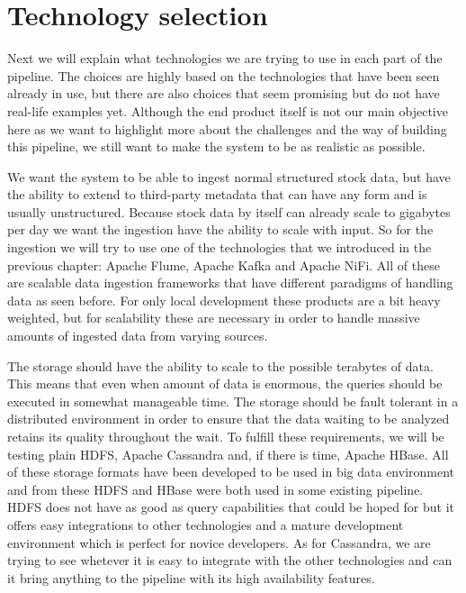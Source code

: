 \section{Technology selection}

Next we will explain what technologies we are trying to use in each part of the pipeline.
The choices are highly based on the technologies that have been seen already in use, but there are also choices that seem promising but do not have real-life examples yet.
Although the end product itself is not our main objective here as we want to highlight more about the challenges and the way of building this pipeline, we still want to make the system to be as realistic as possible.

We want the system to be able to ingest normal structured stock data, but have the ability to extend to third-party metadata that can have any form and is usually unstructured.
Because stock data by itself can already scale to gigabytes per day we want the ingestion have the ability to scale with input.
So for the ingestion we will try to use one of the technologies that we introduced in the previous chapter: Apache Flume, Apache Kafka and Apache NiFi.
All of these are scalable data ingestion frameworks that have different paradigms of handling data as seen before.
For only local development these products are a bit heavy weighted, but for scalability these are necessary in order to handle massive amounts of ingested data from varying sources.

The storage should have the ability to scale to the possible terabytes of data.
This means that even when amount of data is enormous, the queries should be executed in somewhat manageable time.
The storage should be fault tolerant in a distributed environment in order to ensure that the data waiting to be analyzed retains its quality throughout the wait.
To fulfill these requirements, we will be testing plain HDFS, Apache Cassandra and, if there is time, Apache HBase.
All of these storage formats have been developed to be used in big data environment and from these HDFS and HBase were both used in some existing pipeline.
HDFS does not have as good as query capabilities that could be hoped for but it offers easy integrations to other technologies and a mature development environment which is perfect for novice developers.
As for Cassandra, we are trying to see whetever it is easy to integrate with the other technologies and can it bring anything to the pipeline with its high availability features.

